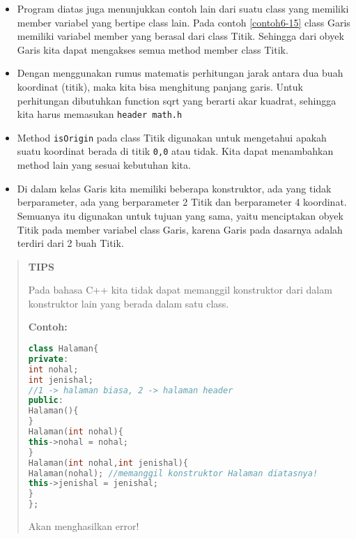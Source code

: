 \begin{itemize}

\item
  Program diatas juga menunjukkan contoh lain dari suatu class yang
  memiliki member variabel yang bertipe class lain. Pada contoh \ref{contoh6-15}
  class Garis memiliki variabel member yang berasal dari class Titik.
  Sehingga dari obyek Garis kita dapat mengakses semua method member
  class Titik.
\item
  Dengan menggunakan rumus matematis perhitungan jarak antara dua buah
  koordinat (titik), maka kita bisa menghitung panjang garis. Untuk
  perhitungan dibutuhkan function sqrt yang berarti akar kuadrat,
  sehingga kita harus memasukan \texttt{header\ math.h}
\item
  Method \texttt{isOrigin} pada class Titik digunakan untuk mengetahui
  apakah suatu koordinat berada di titik \texttt{0,0} atau tidak. Kita
  dapat menambahkan method lain yang sesuai kebutuhan kita.
\item
  Di dalam kelas Garis kita memiliki beberapa konstruktor, ada yang
  tidak berparameter, ada yang berparameter 2 Titik dan berparameter 4
  koordinat. Semuanya itu digunakan untuk tujuan yang sama, yaitu
  menciptakan obyek Titik pada member variabel class Garis, karena Garis
  pada dasarnya adalah terdiri dari 2 buah Titik.
\end{itemize}

\begin{quotation}
{\LARGE {}}  \textbf{TIPS} 
	
Pada bahasa C++ kita tidak dapat memanggil konstruktor dari dalam konstruktor
lain yang berada dalam satu class.
	
\textbf{Contoh:}
	
\begin{lstlisting}[language=c++, numbers=none]
class Halaman{
private:
int nohal;
int jenishal;
//1 -> halaman biasa, 2 -> halaman header
public:
Halaman(){
}
Halaman(int nohal){
this->nohal = nohal;
}
Halaman(int nohal,int jenishal){
Halaman(nohal); //memanggil konstruktor Halaman diatasnya!
this->jenishal = jenishal;
}
};
\end{lstlisting}
	
 Akan menghasilkan error!
\end{quotation}

